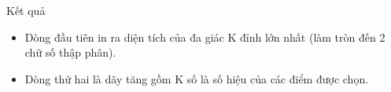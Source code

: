 Kết quả
\begin{itemize}
	\item     Dòng đầu tiên in ra diện tích của đa giác K đỉnh lớn nhất (làm tròn đến 2 chữ số thập phân).   
	\item     Dòng thứ hai là dãy tăng gồm K số là số hiệu của các điểm được chọn.   
\end{itemize}